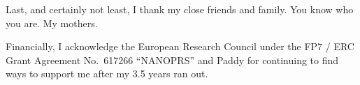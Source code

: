 Last, and certainly not least, I thank my close friends and family.
You know who you are.
My mothers.

Financially, I acknowledge the European Research Council under the FP7 / ERC Grant Agreement No.\ 617266 ``NANOPRS'' and Paddy for continuing to find ways to support me after my 3.5 years ran out.


